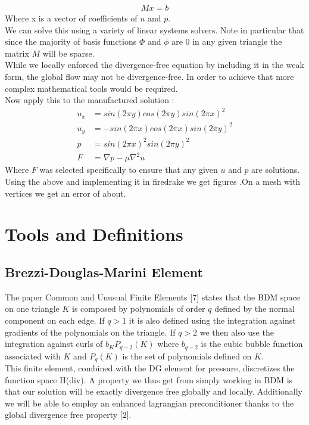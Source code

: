 \documentclass[11pt,twoside,a4paper]{article}
\begin{document}
\begin{align}
M x = b
\end{align}
Where x is a vector of coefficients of $u$ and $p$.\\
We can solve this using a variety of linear systems solvers. Note in particular that since the majority of basis functions $\Phi$ and $\phi$ are $0$ in any given triangle the matrix $M$ will be sparse.\\
While we locally enforced the divergence-free equation by including it in the weak form, the global flow may not be divergence-free. In order to achieve that more complex mathematical tools would be required.\\
Now apply this to the manufactured solution :
\begin{align*}
u_x &=  sin(2 \pi y) cos(2 \pi y)  sin(2 \pi x)^2 \\
u_y &= -sin(2 \pi x) cos(2 \pi x)  sin(2 \pi y)^2 \\
p &= sin(2 \pi x)^2 sin(2 \pi y)^2 \\
F &= \nabla p - \mu \nabla^2 u
\end{align*}
Where $F$ was selected specifically to ensure that any given $u$ and $p$ are solutions.
Using the above and implementing it in firedrake we get figures .On a mesh with vertices we get an error of about.

\section{Tools and Definitions}
\subsection{Brezzi-Douglas-Marini Element}
The paper Common and Unusual Finite Elements [7] states that the BDM space on one triangle $K$ is composed by polynomials of order $q$ defined by the normal component on each edge. If $q > 1$ it is also defined using the integration against gradients of the polynomials on the triangle. If $q > 2$ we then also use the integration  against curls of $b_K P_{q-2}(K)$ where $b_{q-2}$ is the  cubic bubble function associated with $K$ and $P_{q}(K)$ is the set of polynomials defined on $K$.\\
This finite element, combined with the DG element for pressure, discretizes the function space H(div). A property we thus get from simply working in BDM is that our solution will be exactly divergence free globally and locally.
Additionally we will be able to employ an enhanced lagrangian preconditioner thanks to the global divergence free property [2].\\
\end{document}
